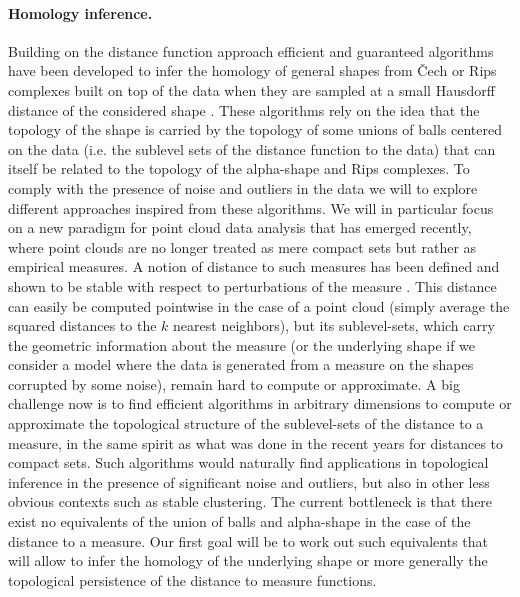 

\paragraph{Homology inference.}
Building on the distance function approach efficient and guaranteed algorithms have been developed to infer the homology of general shapes from \v{C}ech or Rips complexes built on top of the data when they are sampled at a small Hausdorff distance of the considered shape \cite{co-tpr-2008}. These algorithms rely on  the idea that the topology of the shape is carried  by the topology of some  unions of balls centered on the data (i.e. the sublevel sets of the distance function to the data)  that can itself be related to the topology of the  alpha-shape and Rips complexes.
To comply with the presence of noise and outliers in the data we will to explore different approaches inspired from these algorithms. 
We will in particular focus on a new paradigm for point cloud data analysis that has emerged recently, where point clouds are no
longer treated as mere compact sets but rather as empirical measures. A notion of distance to
such measures has been defined and shown to be stable with respect to perturbations of the
measure \cite{ccsm-gipm-2011}. This distance can easily be computed pointwise in the case of a point cloud (simply
average the squared distances to the $k$ nearest neighbors), but its sublevel-sets, which carry the
geometric information about the measure (or the underlying shape if we consider a model where the data is generated from a measure on the shapes corrupted by some noise), remain hard to compute or approximate. A big challenge now is to find efficient algorithms in arbitrary dimensions to compute or approximate
the topological structure of the sublevel-sets of the distance to a measure, in the same spirit as
what was done in the recent years for distances to compact sets. Such algorithms would naturally
find applications in topological inference in the presence of significant noise and outliers, but
also in other less obvious contexts such as stable clustering. The current bottleneck is that 
there exist no equivalents of the union of balls and alpha-shape in the case of the distance to
a measure. Our first goal will be to work out such equivalents that will allow to infer the homology of the underlying shape or more generally the topological persistence of the distance to measure functions.

